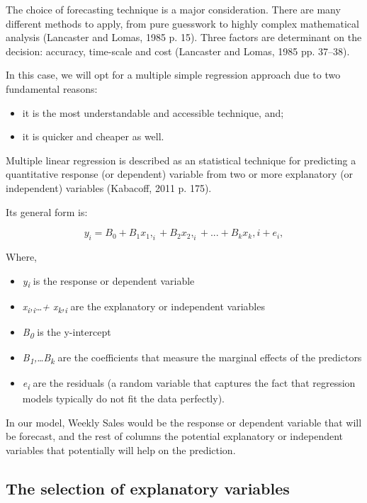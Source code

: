 \documentclass[11pt,]{article}
\providecommand{\tightlist}{%
  \setlength{\itemsep}{0pt}\setlength{\parskip}{0pt}}
\begin{document}
The choice of forecasting technique is a major consideration. There are
many different methods to apply, from pure guesswork to highly complex
mathematical analysis (Lancaster and Lomas, 1985 p. 15). Three factors
are determinant on the decision: accuracy, time-scale and cost
(Lancaster and Lomas, 1985 pp. 37--38).

In this case, we will opt for a multiple simple regression approach due
to two fundamental reasons:

\begin{itemize}
\item
  it is the most understandable and accessible technique, and;
\item
  it is quicker and cheaper as well.
\end{itemize}

Multiple linear regression is described as an statistical technique for
predicting a quantitative response (or dependent) variable from two or
more explanatory (or independent) variables (Kabacoff, 2011 p. 175).

Its general form is:

\[{y_i} = {B}_0 + {B}_1{x}_1,_i + {B}_2{x}_2,_i+...+ {B}_k{x}_k,i + {e}_i,\]

Where,

\begin{itemize}
\tightlist
\item
  \emph{y\textsubscript{i}} is the response or dependent variable
\item
  \emph{x\textsubscript{i},\textsubscript{i}\ldots{}+
  x\textsubscript{k},\textsubscript{i}} are the explanatory or
  independent variables
\item
  \emph{B\textsubscript{0}} is the y-intercept
\item
  \emph{B\textsubscript{1},\ldots{}B\textsubscript{k}} are the
  coefficients that measure the marginal effects of the predictors
\item
  \emph{e\textsubscript{i}} are the residuals (a random variable that
  captures the fact that regression models typically do not fit the data
  perfectly).
\end{itemize}

In our model, Weekly Sales would be the response or dependent variable
that will be forecast, and the rest of columns the potential explanatory
or independent variables that potentially will help on the prediction.

\subsection{The selection of explanatory
variables}\label{the-selection-of-explanatory-variables}
\end{document}
